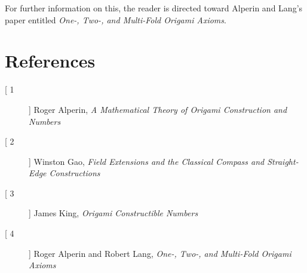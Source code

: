 \documentclass[]{article}
\begin{document}
    For further information on this, the reader is directed toward Alperin and Lang's paper entitled \emph{One-, Two-, and Multi-Fold Origami Axioms}.
    
    \section*{References}
    \begin{description}
    	\item[[ 1]]
    	Roger Alperin, \emph{A Mathematical Theory of Origami Construction and Numbers}
    	\item[[ 2]]
    	Winston Gao, \emph{Field Extensions and the Classical Compass and Straight-Edge Constructions}
    	\item[[ 3]]
    	James King, \emph{Origami Constructible Numbers}
    	\item[[ 4]]
    	Roger Alperin and Robert Lang, \emph{One-, Two-, and Multi-Fold Origami Axioms}
    \end{description}
\end{document}
